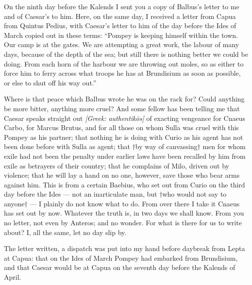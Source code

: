 

 On the ninth day before the Kalends I sent you a copy of Balbus's letter to me and of Caesar's to him. Here, on the same day, I received a letter from Capua from Quintus Pedius, with Caesar's letter to him of the day before the Ides of March copied out in these terms: ``Pompey is keeping himself within the town. Our camp is at the gates. We are attempting a great work, the labour of many days, because of the depth of the sea; but still there is nothing better we could be doing. From each horn of the harbour we are throwing out moles, so as either to force him to ferry across what troops he has at Brundisium as soon as possible, or else to shut off his way out.''

 Where is that peace which Balbus wrote he was on the rack for? Could anything be more bitter, anything more cruel? And some fellow has been telling me that Caesar speaks straight out \textit{[Greek: authentik\=os]} of exacting vengeance for Cnaeus Carbo, for Marcus Brutus, and for all those on whom Sulla was cruel with this Pompey as his partner; that nothing he is doing with Curio as his agent has not been done before with Sulla as agent; that $\dagger$by way of canvassing$\dagger$ men for whom exile had not been the penalty under earlier laws have been recalled by him from exile as betrayers of their country; that he complains of Milo, driven out by violence; that he will lay a hand on no one, however, save those who bear arms against him. This is from a certain Baebius, who set out from Curio on the third day before the Ides --- not an inarticulate man, but $\dagger$who would not say to anyone$\dagger$ --- I plainly do not know what to do. From over there I take it Cnaeus has set out by now. Whatever the truth is, in two days we shall know. From you no letter, not even by Anteros; and no wonder. For what is there for us to write about? I, all the same, let no day slip by.

 The letter written, a dispatch was put into my hand before daybreak from Lepta at Capua: that on the Ides of March Pompey had embarked from Brundisium, and that Caesar would be at Capua on the seventh day before the Kalends of April.
